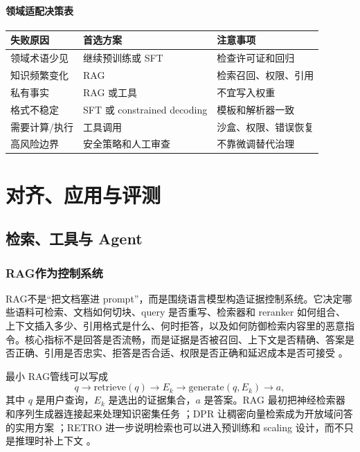 \documentclass[UTF8,zihao=-4,openany]{ctexbook}
\newcommand{\rag}{RAG}
\begin{document}
\subsection{领域适配决策表}
\begin{center}
\begin{tabular}{p{}p{}p{}}
\toprule
失败原因 & 首选方案 & 注意事项 \\
\midrule
领域术语少见 & 继续预训练或 SFT & 检查许可证和回归 \\
知识频繁变化 & RAG & 检索召回、权限、引用 \\
私有事实 & RAG 或工具 & 不宜写入权重 \\
格式不稳定 & SFT 或 constrained decoding & 模板和解析器一致 \\
需要计算/执行 & 工具调用 & 沙盒、权限、错误恢复 \\
高风险边界 & 安全策略和人工审查 & 不靠微调替代治理 \\
\bottomrule
\end{tabular}
\end{center}

\part{对齐、应用与评测}

\chapter{检索、工具与 Agent}
\section{\rag 作为控制系统}
\rag 不是“把文档塞进 prompt”，而是围绕语言模型构造证据控制系统。它决定哪些语料可检索、文档如何切块、query 是否重写、检索器和 reranker 如何组合、上下文插入多少、引用格式是什么、何时拒答，以及如何防御检索内容里的恶意指令。核心指标不是回答是否流畅，而是证据是否被召回、上下文是否精确、答案是否正确、引用是否忠实、拒答是否合适、权限是否正确和延迟成本是否可接受 \cite{karpukhin2020dense,lewis2020retrieval,gan2025rag}。

最小 \rag 管线可以写成
\[
  q \rightarrow \mathrm{retrieve}(q) \rightarrow E_k
  \rightarrow \mathrm{generate}(q,E_k) \rightarrow a,
\]
其中 $q$ 是用户查询，$E_k$ 是选出的证据集合，$a$ 是答案。RAG 最初把神经检索器和序列生成器连接起来处理知识密集任务 \cite{lewis2020retrieval}；DPR 让稠密向量检索成为开放域问答的实用方案 \cite{karpukhin2020dense}；RETRO 进一步说明检索也可以进入预训练和 scaling 设计，而不只是推理时补上下文 \cite{borgeaud2022retro}。
\end{document}
